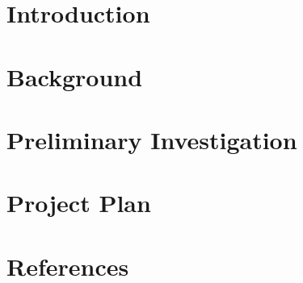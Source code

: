 






\section{Introduction}



\newpage

\section{Background}



\section{Preliminary Investigation}



\section{Project Plan}



\newpage

\section{References}

\printbibliography[heading=none]




